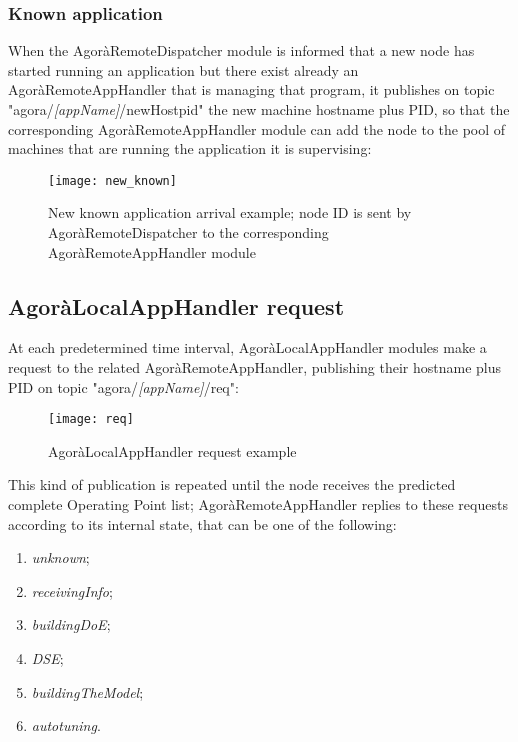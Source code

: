 \subsubsection{Known application}\label{knownApp}

When the AgoràRemoteDispatcher module is informed that a new node has started running an application but there exist already an AgoràRemoteAppHandler that is managing that program, it publishes on topic "agora/\textit{[appName]}/newHostpid" the new machine hostname plus PID, so that the corresponding AgoràRemoteAppHandler module can add the node to the pool of machines that are running the application it is supervising:

\begin{figure}[H]

    \centering
    \texttt{[image: new\_known]}
    \caption[New known application arrival example]{New known application arrival example; node ID is sent by AgoràRemoteDispatcher to the corresponding AgoràRemoteAppHandler module}
    
\end{figure}





\subsection{AgoràLocalAppHandler request}\label{clientReq}

At each predetermined time interval, AgoràLocalAppHandler modules make a request to the related AgoràRemoteAppHandler, publishing their hostname plus PID on topic "agora/\textit{[appName]}/req":

\begin{figure}[H]

    \centering
    \texttt{[image: req]}
    \caption{AgoràLocalAppHandler request example}
    
\end{figure}

This kind of publication is repeated until the node receives the predicted complete Operating Point list; AgoràRemoteAppHandler replies to these requests according to its internal state, that can be one of the following:

\begin{enumerate}

    \item \textit{unknown};

    \item \textit{receivingInfo};

    \item \textit{buildingDoE};

    \item \textit{DSE};

    \item \textit{buildingTheModel};

    \item \textit{autotuning}.

\end{enumerate}


